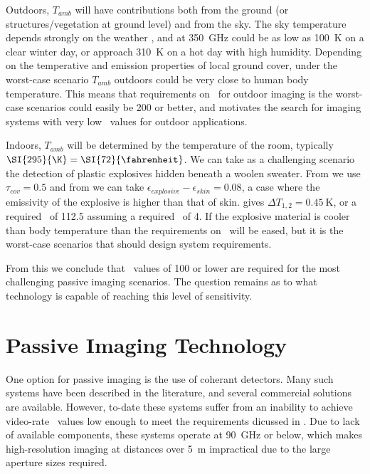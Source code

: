Outdoors, $T_{amb}$ will have contributions both from the ground (or structures/vegetation at ground level) and from the sky.
The sky temperature depends strongly on the weather \cite{appleby_standoff_2007}, and at \SI{350}{\GHz} could be as low as \SI{100}{\K} on a clear winter day, or approach \SI{310}{\K} on a hot day with high humidity.
Depending on the temperative and emission properties of local ground cover, under the worst-case scenario $T_{amb}$ outdoors could be very close to human body temperature.
This means that requirements on \NETD\ for outdoor imaging is the worst-case scenarios could easily be \SI{200}{\mK} or better, and motivates the search for imaging systems with very low \NETD\ values for outdoor applications. 

Indoors, $T_{amb}$ will be determined by the temperature of the room, typically $\SI{295}{\K} = \SI{72}{\fahrenheit}$.
We can take as a challenging scenario the detection of plastic explosives hidden beneath a woolen sweater.
From \cite{bjarnason_millimeter-wave_2004} we use $\tau_{cov} = 0.5$ and from \cite{appleby_standoff_2007} we can take $\epsilon_{explosive} - \epsilon_{skin} = 0.08$, a case where the emissivity of the explosive is higher than that of skin.
 gives $\Delta T_{1,2} = \SI{0.45}{\K}$, or a required \NETD\ of \SI{112.5}{\mK} assuming a required \SN\ of 4.
If the explosive material is cooler than body temperature than the requirements on \NETD\ will be eased, but it is the worst-case scenarios that should design system requirements.

From this we conclude that \NETD\ values of \SI{100}{\mK} or lower are required for the most challenging passive imaging scenarios.
The question remains as to what technology is capable of reaching this level of sensitivity.

\section{Passive Imaging Technology}

One option for passive imaging is the use of coherant detectors.
Many such systems have been described in the literature, and several commercial solutions are available.
However, to-date these systems suffer from an inability to achieve video-rate \NETD\ values low enough to meet the requirements dicussed in .
Due to lack of available components, these systems operate at \SI{90}{\GHz} or below, which makes high-resolution imaging at distances over \SI{5}{\m} impractical due to the large aperture sizes required.

